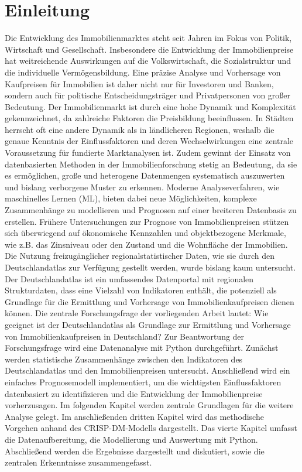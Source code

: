 \newpage

\section{Einleitung} \label{einleitung}

Die Entwicklung des Immobilienmarktes steht seit Jahren im Fokus von Politik, Wirtschaft und Gesellschaft. Insbesondere die Entwicklung der Immobilienpreise hat weitreichende Auswirkungen auf die Volkswirtschaft, die Sozialstruktur und die individuelle Vermögensbildung. Eine präzise Analyse und Vorhersage von Kaufpreisen für Immobilien ist daher nicht nur für Investoren und Banken, sondern auch für politische Entscheidungsträger und Privatpersonen von großer Bedeutung.
Der Immobilienmarkt ist durch eine hohe Dynamik und Komplexität gekennzeichnet, da zahlreiche Faktoren die Preisbildung beeinflussen. In Städten herrscht oft eine andere Dynamik als in ländlicheren Regionen, weshalb die genaue Kenntnis der Einflussfaktoren und deren Wechselwirkungen eine zentrale Voraussetzung für fundierte Marktanalysen ist. Zudem gewinnt der Einsatz von datenbasierten Methoden in der Immobilienforschung stetig an Bedeutung, da sie es ermöglichen, große und heterogene Datenmengen systematisch auszuwerten und bislang verborgene Muster zu erkennen. Moderne Analyseverfahren, wie maschinelles Lernen (ML), bieten dabei neue Möglichkeiten, komplexe Zusammenhänge zu modellieren und Prognosen auf einer breiteren Datenbasis zu erstellen.
Frühere Untersuchungen zur Prognose von Immobilienpreisen stützen sich überwiegend auf ökonomische Kennzahlen und objektbezogene Merkmale, wie z.B. das Zinsniveau oder den Zustand und die Wohnfläche der Immobilien. Die Nutzung freizugänglicher regionalstatistischer Daten, wie sie durch den Deutschlandatlas zur Verfügung gestellt werden, wurde bislang kaum untersucht. Der Deutschlandatlas ist ein umfassendes Datenportal mit regionalen Strukturdaten, dass eine Vielzahl von Indikatoren enthält, die potenziell als Grundlage für die Ermittlung und Vorhersage von Immobilienkaufpreisen dienen können. 
Die zentrale Forschungsfrage der vorliegenden Arbeit lautet: Wie geeignet ist der Deutschlandatlas als Grundlage zur Ermittlung und Vorhersage von Immobilienkaufpreisen in Deutschland?
Zur Beantwortung der Forschungsfrage wird eine Datenanalyse mit Python durchgeführt. Zunächst werden statistische Zusammenhänge zwischen den Indikatoren des Deutschlandatlas und den Immobilienpreisen untersucht. Anschließend wird ein einfaches Prognosemodell implementiert, um die wichtigsten Einflussfaktoren datenbasiert zu identifizieren und die Entwicklung der Immobilienpreise vorherzusagen. Im folgenden Kapitel werden zentrale Grundlagen für die weitere Analyse gelegt. Im anschließenden dritten Kapitel wird das methodische Vorgehen anhand des CRISP-DM-Modells dargestellt. Das vierte Kapitel umfasst die Datenaufbereitung, die Modellierung und Auswertung mit Python. Abschließend werden die Ergebnisse dargestellt und diskutiert, sowie die zentralen Erkenntnisse zusammengefasst.